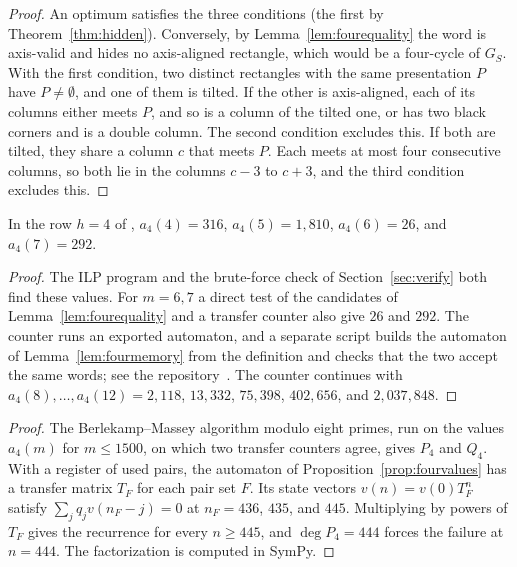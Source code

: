 \begin{proof}
An optimum satisfies the three conditions (the first by Theorem~\ref{thm:hidden}). Conversely, by Lemma~\ref{lem:fourequality} the word is axis-valid and hides no axis-aligned rectangle, which would be a four-cycle of $G_S$. With the first condition, two distinct rectangles with the same presentation $P$ have $P\ne\emptyset$, and one of them is tilted. If the other is axis-aligned, each of its columns either meets $P$, and so is a column of the tilted one, or has two black corners and is a double column. The second condition excludes this. If both are tilted, they share a column $c$ that meets $P$. Each meets at most four consecutive columns, so both lie in the columns $c-3$ to $c+3$, and the third condition excludes this.
\end{proof}

\begin{proposition}\label{prop:fourvalues}
In the row $h=4$ of , $a_4(4)=316$, $a_4(5)=1{,}810$, $a_4(6)=26$, and $a_4(7)=292$.
\end{proposition}

\begin{proof}
The ILP program and the brute-force check of Section~\ref{sec:verify} both find these values. For $m=6,7$ a direct test of the candidates of Lemma~\ref{lem:fourequality} and a transfer counter also give $26$ and $292$. The counter runs an exported automaton, and a separate script builds the automaton of Lemma~\ref{lem:fourmemory} from the definition and checks that the two accept the same words; see the repository~\cite{repo}. The counter continues with $a_4(8),\ldots,a_4(12)=2{,}118$, $13{,}332$, $75{,}398$, $402{,}656$, and $2{,}037{,}848$.
\end{proof}

\begin{proof}
The Berlekamp--Massey algorithm modulo eight primes, run on the values $a_4(m)$ for $m\le1500$, on which two transfer counters agree, gives $P_4$ and $Q_4$. With a register of used pairs, the automaton of Proposition~\ref{prop:fourvalues} has a transfer matrix $T_F$ for each pair set $F$. Its state vectors $v(n)=v(0)T_F^n$ satisfy $\sum_jq_jv(n_F-j)=0$ at $n_F=436$, $435$, and $445$. Multiplying by powers of $T_F$ gives the recurrence for every $n\ge445$, and $\deg P_4=444$ forces the failure at $n=444$. The factorization is computed in SymPy.
\end{proof}

